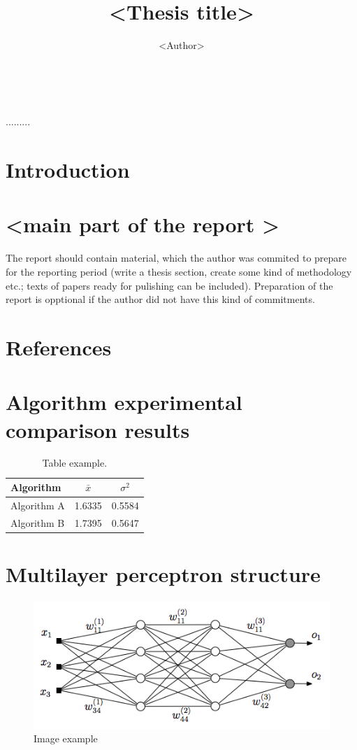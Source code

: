\documentclass[11pt, a4paper]{article}
\date{\monthname\ \the\year}
\title{<Thesis title>}
\author{<Author>}
\begin{document}
\maketitle

.........


\tableofcontents

\section{Introduction}

\section{<main part of the report >}
The report should contain material, which the author was commited to prepare
for the reporting period (write a thesis section, create some kind of
methodology etc.; texts of papers ready for pulishing can be included).
Preparation of the report is opptional if the author did not have this kind of
commitments.

\section{References}%
%    

\appendix
\section{Algorithm experimental comparison results}
\begin{table}[H]
  \centering
  \caption{Table example.}
  {\begin{tabular}{|l|c|c|} \hline
    Algorithm    & $\bar{x}$ & $\sigma^{2}$ \\
    \hline
    Algorithm A  & 1.6335    & 0.5584       \\
    Algorithm B  & 1.7395    & 0.5647       \\
    \hline
  \end{tabular}}
  \label{tab:table example}
\end{table}

\section{Multilayer perceptron structure}
\begin{figure}[H]
    \centering
\includegraphics[scale=0.5]{img/MLP}
\caption{Image example}
\end{figure}
\end{document}

